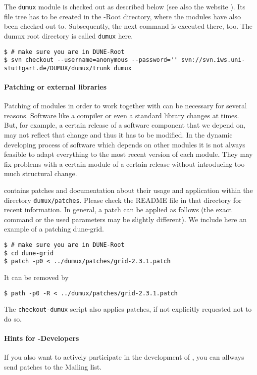 The \texttt{dumux} module is checked out as described below (see also the \Dumux website \cite{DUMUX-HP}).
Its file tree has to be created in the \Dune-Root directory, where the \Dune modules
have also been checked out to. Subsequently, the next command
is executed there, too. The dumux root directory is called \texttt{dumux} here.

\begin{lstlisting}[style=Bash]
$ # make sure you are in DUNE-Root
$ svn checkout --username=anonymous --password='' svn://svn.iws.uni-stuttgart.de/DUMUX/dumux/trunk dumux
\end{lstlisting}

\paragraph{Patching \Dune or external libraries}
\label{sc:patchingDUNE}
Patching of \Dune modules in order to work together with \Dumux can be necessary for several reasons.
Software like a compiler or even a standard library
changes at times. But, for example, a certain release of a software component that we depend on,
may not reflect that change and thus it has to be modified.
In the dynamic developing process of software which depends on other modules it is not always feasible
to adapt everything to the most recent version of each module. They may fix problems with a certain module
of a certain release without introducing too much structural change.

\Dumux contains patches and documentation about their usage and application within the
directory \texttt{dumux/patches}.
Please check the README file in that directory for recent information.
In general, a patch can be applied as follows
(the exact command or the used parameters may be slightly different).
We include here an example of a patching dune-grid.

\begin{lstlisting}[style=Bash]
$ # make sure you are in DUNE-Root
$ cd dune-grid
$ patch -p0 < ../dumux/patches/grid-2.3.1.patch
\end{lstlisting}

It can be removed by
\begin{lstlisting}[style=Bash]
$ path -p0 -R < ../dumux/patches/grid-2.3.1.patch
\end{lstlisting}

The \texttt{checkout-dumux} script also applies patches, if not explicitly requested not to do so.

\paragraph{Hints for \Dumux-Developers}
If you also want to actively participate in the development of \Dumux, you can allways send patches
to the Mailing list.

